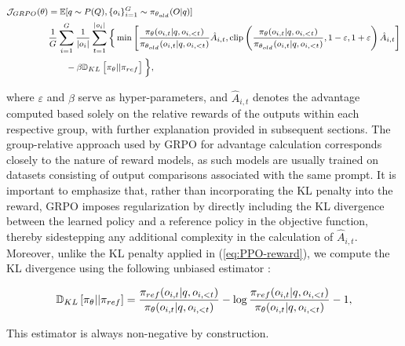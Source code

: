 \begin{itemize}[topsep=0pt]
\begin{equation}
\footnotesize
\begin{split}
    \mathcal{J}_{GRPO}(\theta) &= \mathbb{E}{[q \sim P(Q), \{o_i\}_{i=1}^G \sim \pi_{\theta_{old}}(O|q)]}  \\
    & \frac{1}{G}\sum_{i=1}^G\frac{1}{|o_i|} \sum_{t=1}^{|o_i|} \bigg\{ \min \left[ \frac{\pi_\theta(o_{i,t} | q, o_{i,<t})}{\pi_{\theta_{old}}(o_{i,t} | q, o_{i,<t})} \hat{A}_{i,t}, \text{clip} \left( \frac{\pi_\theta(o_{i,t} | q, o_{i,<t})}{\pi_{\theta_{old}}(o_{i,t} | q, o_{i,<t})}, 1 - \varepsilon, 1 + \varepsilon \right)  \hat{A}_{i,t} \right] \\
    &\qquad - \beta \mathbb{D}_{KL}\left[\pi_{\theta} || \pi_{ref}\right] \bigg\},
\end{split}
\label{eq:GRPO-obj}
\end{equation}

where $\varepsilon$ and $\beta$ serve as hyper-parameters, and $\hat{A}_{i,t}$ denotes the advantage computed based solely on the relative rewards of the outputs within each respective group, with further explanation provided in subsequent sections. The group-relative approach used by GRPO for advantage calculation corresponds closely to the nature of reward models, as such models are usually trained on datasets consisting of output comparisons associated with the same prompt. It is important to emphasize that, rather than incorporating the KL penalty into the reward, GRPO imposes regularization by directly including the KL divergence between the learned policy and a reference policy in the objective function, thereby sidestepping any additional complexity in the calculation of $\hat{A}_{i,t}$. Moreover, unlike the KL penalty applied in (\ref{eq:PPO-reward}), we compute the KL divergence using the following unbiased estimator \citep{kl_approx}:

\begin{equation}
\small
    \mathbb{D}_{KL}\left[\pi_{\theta} || \pi_{ref}\right] = \frac{\pi_{ref}(o_{i,t}|q,o_{i,<t})}{\pi_{\theta}(o_{i,t}|q,o_{i,<t})}- \log\frac{\pi_{ref}(o_{i,t}|q,o_{i,<t})}{\pi_{\theta}(o_{i,t}|q,o_{i,<t})} - 1,
\end{equation}

This estimator is always non-negative by construction.


\end{itemize}
